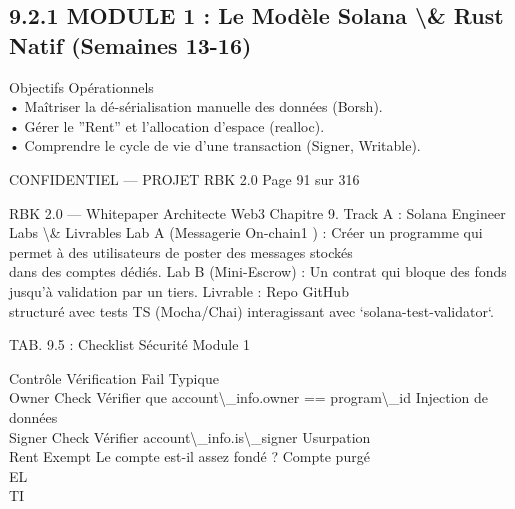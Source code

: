 \subsection{9.2.1 MODULE 1 : Le Modèle Solana \textbackslash{}& Rust Natif (Semaines 13-16)}
Objectifs Opérationnels\\
\vspace{0.5em}
• Maîtriser la dé-sérialisation manuelle des données (Borsh).\\
\vspace{0.5em}
• Gérer le ”Rent” et l’allocation d’espace (realloc).\\
\vspace{0.5em}
• Comprendre le cycle de vie d’une transaction (Signer, Writable).\\
\vspace{0.5em}
\vspace{0.5em}
\vspace{0.5em}
\begin{confidential}CONFIDENTIEL — PROJET RBK 2.0                                Page 91 sur 316\end{confidential}
RBK 2.0 — Whitepaper Architecte Web3                                                                                   Chapitre 9. Track A : Solana Engineer\\
\vspace{0.5em}
\vspace{0.5em}
Labs \textbackslash{}& Livrables Lab A (Messagerie On-chain1 ) : Créer un programme qui permet à des utilisateurs de poster des messages stockés\\
dans des comptes dédiés. Lab B (Mini-Escrow) : Un contrat qui bloque des fonds jusqu’à validation par un tiers. Livrable : Repo GitHub\\
structuré avec tests TS (Mocha/Chai) interagissant avec ‘solana-test-validator‘.\\
\vspace{0.5em}
\begin{center}\begin{tabular}TAB. 9.5 : Checklist Sécurité Module 1\end{tabular}\end{center}
\vspace{0.5em}
\vspace{0.5em}
Contrôle     Vérification                                 Fail Typique\\
Owner Check Vérifier que account\textbackslash{}_info.owner == program\textbackslash{}_id Injection de données\\
Signer Check Vérifier account\textbackslash{}_info.is\textbackslash{}_signer              Usurpation\\
Rent Exempt Le compte est-il assez fondé ?                Compte purgé\\
\vspace{0.5em}
\vspace{0.5em}
\vspace{0.5em}
\vspace{0.5em}
EL\\
TI\\
